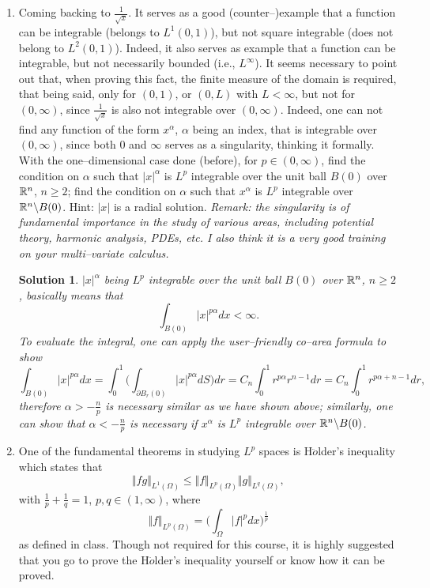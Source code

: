 \documentclass[6pt]{article}
\newtheorem{solution}{Solution}
\numberwithin{equation}{section}
\def\mathbb{\Bbb}
\begin{document}
\begin{enumerate}
\item Coming backing to $\frac{1}{\sqrt{x}}$.  It serves as a good (counter--)example that a function can be integrable (belongs to $L^1(0,1)$), but not square integrable (does not belong to $L^2(0,1)$).  Indeed, it also serves as example that a function can be integrable, but not necessarily bounded (i.e., $L^\infty$).  It seems necessary to point out that, when proving this fact, the finite measure of the domain is required, that being said, only for $(0,1)$, or $(0,L)$ with $L<\infty$, but not for $(0,\infty)$, since $\frac{1}{\sqrt{x}}$ is also not integrable over $(0,\infty)$.  Indeed, one can not find any function of the form $x^\alpha$,  $\alpha$ being an index, that is integrable over $(0,\infty)$, since both 0 and $\infty$ serves as a singularity, thinking it formally.  With the one--dimensional case done (before), for $p\in(0,\infty)$, find the condition on $\alpha$ such that $|x|^\alpha$ is $L^p$ integrable over the unit ball $B(0)$ over $\mathbb R^n$, $n\geq2$;  find the condition on $\alpha$ such that $x^\alpha$ is $L^p$ integrable over $\mathbb R^n\backslash B(0)$.  Hint: $|x|$ is a radial solution.  \emph{Remark: the singularity is of fundamental importance in the study of various areas, including potential theory, harmonic analysis, PDEs, etc.  I also think it is a very good training on your multi--variate calculus.}
\begin{solution}
$|x|^\alpha$ being $L^p$ integrable over the unit ball $B(0)$ over $\mathbb R^n$, $n\geq2$, basically means that
\[\int_{B(0)} |x|^{p\alpha}dx< \infty.\]
To evaluate the integral, one can apply the user--friendly co--area formula to show
\[\int_{B(0)} |x|^{p\alpha}dx=\int_0^1 \Big(\int_{\partial B_r(0)} |x|^{p\alpha} dS \Big) dr=C_n\int_0^1 r^{p\alpha } r^{n-1} dr=C_n\int_0^1 r^{p\alpha+n-1}dr,\]
therefore $\alpha>-\frac{n}{p}$ is necessary similar as we have shown above; similarly, one can show that $\alpha<-\frac{n}{p}$ is necessary if $x^\alpha$ is $L^p$ integrable over $\mathbb R^n\backslash B(0)$.
\end{solution}

\item One of the fundamental theorems in studying $L^p$ spaces is H$\ddot{o}$lder's inequality which states that
\begin{equation}\label{holder}
\Vert fg \Vert_{L^1(\Omega)}\leq \Vert f\Vert_{L^p(\Omega)} \Vert g\Vert_{L^q(\Omega)},
\end{equation}
with $\frac{1}{p}+\frac{1}{q}=1$, $p,q\in(1,\infty)$, where
\[\Vert f\Vert_{L^p(\Omega)}=\Big(\int_\Omega \vert f \vert^p dx\Big)^\frac{1}{p}\]
as defined in class.  Though not required for this course, it is highly suggested that you go to prove the H$\ddot{o}$lder's inequality yourself or know how it can be proved.


\end{enumerate}
\end{document}
